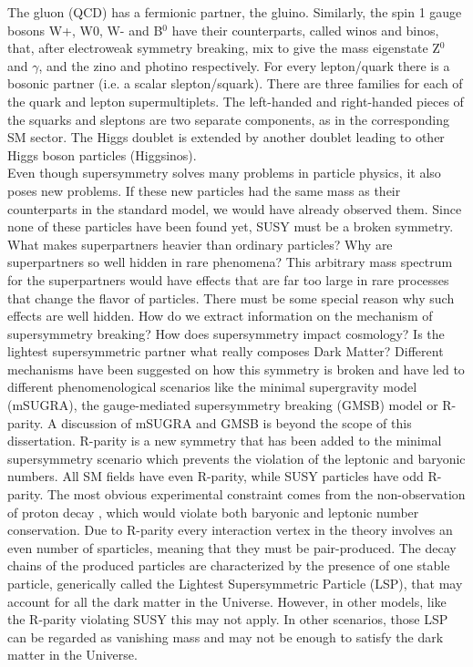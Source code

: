 The gluon (QCD) has a fermionic partner, the gluino. Similarly, the spin 1 gauge bosons W+, W0, W- and B$^0$ have their counterparts, called winos and binos, that, after electroweak symmetry breaking, mix to give the mass eigenstate Z$^0$ and $\gamma$, and the zino and photino respectively. For every lepton/quark there is a bosonic partner (i.e. a scalar slepton/squark). There are three families for each of the quark and lepton supermultiplets. The left-handed and right-handed pieces of the squarks and sleptons are two separate components, as in the corresponding SM sector. The Higgs doublet is extended by another doublet leading to other Higgs boson particles (Higgsinos).\\

Even though supersymmetry solves many problems in particle physics, it also poses new problems. If these new particles had the same mass as their counterparts in the standard model, we would have already observed them. Since none of these particles have been found yet, SUSY must be a broken symmetry. What makes superpartners heavier than ordinary particles? Why are superpartners so well hidden in rare phenomena? This arbitrary mass spectrum for the superpartners would have effects that are far too large in rare processes that change the flavor of particles. There must be some special reason why such effects are well hidden. How do we extract information on the mechanism of supersymmetry breaking? How does supersymmetry impact cosmology? Is the lightest supersymmetric partner what really composes Dark Matter? Different mechanisms have been suggested on how this symmetry is broken and have led to different phenomenological scenarios like the minimal supergravity model (mSUGRA)\cite{mSugra1,mSugra2}, the gauge-mediated supersymmetry breaking (GMSB)\cite{GMSB1,GMSB2,GMSB3} model or R-parity\cite{Rparity1,Rparity2}. A discussion of mSUGRA and GMSB is beyond the scope of this dissertation. R-parity is a new symmetry that has been added to the minimal supersymmetry scenario which prevents the violation of the leptonic and baryonic numbers. All SM fields have even R-parity, while SUSY particles have odd R-parity. The most obvious experimental constraint comes from the non-observation of proton decay \cite{pDecay1}, which would violate both baryonic and leptonic number conservation. Due to R-parity every interaction vertex in the theory involves an even number of sparticles, meaning that they must be pair-produced. The decay chains of the produced particles are characterized by the presence of one stable particle, generically called the Lightest Supersymmetric Particle (LSP), that may account for all the dark matter in the Universe. However, in other models, like the R-parity violating SUSY this may not apply. In other scenarios, those LSP can be regarded as vanishing mass and may not be enough to satisfy the dark matter in the Universe.

